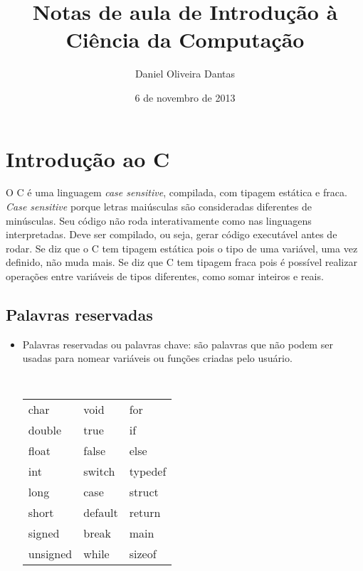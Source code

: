 \documentclass{book}
\title{Notas de aula de Introdução à Ciência da Computação}
\author{Daniel Oliveira Dantas}
\date{6 de novembro de 2013}
\begin{document}
\maketitle


\tableofcontents
\pagestyle{plain}


\chapter{Introdução ao C}

\setcounter{page}{1}    %

O C é uma linguagem {\it case sensitive}, compilada, com tipagem estática e fraca. 
{\it Case sensitive} porque letras maiúsculas são consideradas diferentes de minúsculas. Seu código não roda interativamente como nas linguagens interpretadas. Deve ser compilado, ou seja, gerar código executável antes de rodar. Se diz que o C tem tipagem estática pois o tipo de uma variável, uma vez definido, não muda mais. Se diz que C tem tipagem fraca pois é possível realizar operações entre variáveis de tipos diferentes, como somar inteiros e reais.



\section{Palavras reservadas}

\begin{itemize}

\item Palavras reservadas ou palavras chave: são palavras que não podem ser usadas para nomear variáveis ou funções criadas pelo usuário.

{\tt
\begin{tabular}{lll}
char     & void     & for     \\
double   & true     & if      \\
float    & false    & else    \\
int      & switch   & typedef \\
long     & case     & struct  \\
short    & default  & return  \\
signed   & break    & main    \\
unsigned & while    & sizeof  \\
\end{tabular}
}


\end{itemize}
\end{document}
